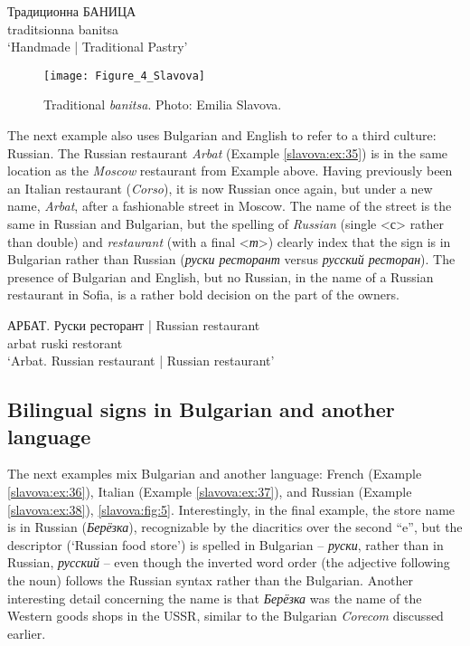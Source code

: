 \documentclass[output=paper]{langscibook}
\begin{document}
\begin{exe}
  \ex\label{slavova:ex:34}
   Традиционна БАНИЦА \\
  { } traditsionna banitsa \\
  \glt ‘Handmade | Traditional Pastry’
\end{exe}

\begin{figure} %
  \texttt{[image: Figure\_4\_Slavova]}
  \caption{Traditional \textit{banitsa}. Photo: Emilia Slavova.}
  \label{slavova:fig:4}
\end{figure}


The next example also uses Bulgarian and English to refer to a third culture: Russian. The Russian restaurant \textit{Arbat} (Example \ref{slavova:ex:35}) is in the same location as the \textit{Moscow} restaurant from Example  above. Having previously been an Italian restaurant (\textit{Corso}), it is now Russian once again, but under a new name, \textit{Arbat}, after a fashionable street in Moscow. The name of the street is the same in Russian and Bulgarian, but the spelling of \textit{Russian} (single <с> rather than double) and \textit{restaurant} (with a final <\textit{т}>) clearly index that the sign is in Bulgarian rather than Russian (\textit{руски ресторант} versus \textit{русский ресторан}). The presence of Bulgarian and English, but no Russian, in the name of a Russian restaurant in Sofia, is a rather bold decision on the part of the owners.

\begin{exe}
  \ex\label{slavova:ex:35}
  \gll АРБАТ. Руски ресторант {| Russian restaurant} \\
  arbat ruski restorant { } \\
  \glt ‘Arbat. Russian restaurant | Russian restaurant’
\end{exe}

\subsection{Bilingual signs in Bulgarian and another language}
The next examples mix Bulgarian and another language: French (Example \ref{slavova:ex:36}), Italian (Example \ref{slavova:ex:37}),
 and Russian (Example  \ref{slavova:ex:38}), \autoref{slavova:fig:5}. Interestingly, in the final example, the store name is in Russian (\textit{Берёзка}), recognizable by the diacritics over the second ``e'', but the descriptor (‘Russian food store’) is spelled in Bulgarian – \textit{руски}, rather than in Russian, \textit{русский} – even though the inverted word order (the adjective following the noun) follows the Russian syntax rather than the Bulgarian. Another interesting detail concerning the name is that \textit{Берёзка} was the name of the Western goods shops in the USSR, similar to the Bulgarian \textit{Corecom} discussed earlier.
\end{document}
